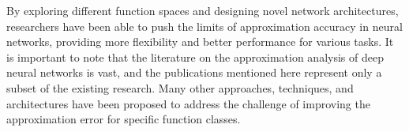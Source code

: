 \documentclass[nohyperref]{article}
\theoremstyle{plain}
\theoremstyle{definition}
\theoremstyle{remark}
\begin{document}
By exploring different function spaces and designing novel network architectures, researchers have been able to push the limits of approximation accuracy in neural networks, providing more flexibility and better performance for various tasks.
It is important to note that the literature on the approximation analysis of deep neural networks is vast, and the publications mentioned here represent only a subset of the existing research. 
Many other approaches, techniques, and architectures have been proposed to address the challenge of improving the approximation error for specific function classes.
\end{document}
